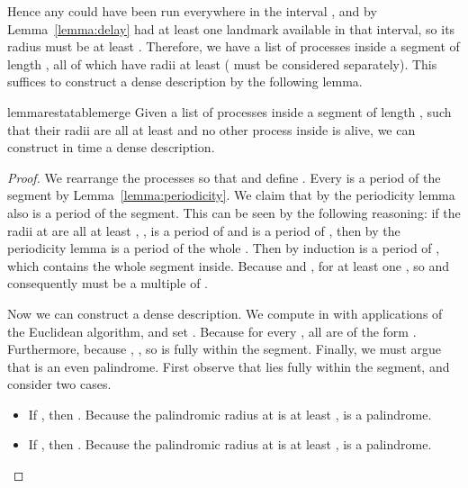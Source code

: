 \documentclass{article}[11pt,letter]
\begin{document}
Hence any  could have been run everywhere in the interval ,
and by Lemma~\ref{lemma:delay} had at least one landmark available in that interval,
so its radius must be at least . Therefore, we have a list of  processes inside a segment of length
, all of which have radii at least  ( must be considered separately).
This suffices to construct a dense description by the following lemma.

\begin{restatable}{lemma}{restatablemerge}
\label{lemma:merge}
Given a list of  processes  inside a segment of length , such that their radii are all at least 
and no other process inside is alive, we can construct in  time a dense description.
\end{restatable}

\begin{proof}
We rearrange the processes so that  and define . Every  is a period of the segment
by Lemma~\ref{lemma:periodicity}. We claim that by the periodicity lemma also  is a period of the 
segment. This can be seen by the following reasoning: if the radii at  are all at least , ,  is a period of
 and  is a period of , then by the periodicity lemma  is a
period of  the whole . Then by induction  is a period
of , which contains the whole segment inside. Because 
and ,
 for at least one , so  and consequently  must be a multiple of .

Now we can construct a dense description. We compute  in  with  applications of the Euclidean algorithm,
and set .
Because  for every , all  are of the form . Furthermore, because , 
, so  is fully within the segment. Finally, we must argue that  is an even palindrome.
First observe that  lies fully within the segment, and consider two cases.
\begin{itemize}
\item If , then . Because the palindromic radius at  is at least ,
 is a palindrome.
\item If , then . Because the palindromic radius at  is at least ,  is a palindrome.\qedhere
\end{itemize}
\end{proof}
\end{document}
